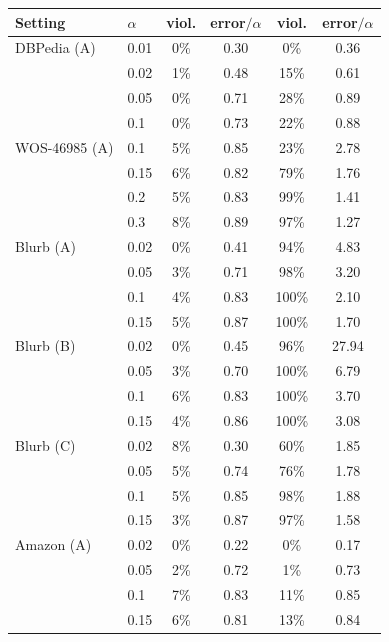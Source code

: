 \begin{tabular}{llcccc}
\toprule
Setting & $\alpha$ & viol. & error$/\alpha$ & viol. & error$/\alpha$ \\
\midrule
DBPedia (A) & 0.01 & 0\% & 0.30 & 0\% & 0.36 \\
 & 0.02 & 1\% & 0.48 & 15\% & 0.61 \\
 & 0.05 & 0\% & 0.71 & 28\% & 0.89 \\
 & 0.1 & 0\% & 0.73 & 22\% & 0.88 \\
\addlinespace
WOS-46985 (A) & 0.1 & 5\% & 0.85 & 23\% & 2.78 \\
 & 0.15 & 6\% & 0.82 & 79\% & 1.76 \\
 & 0.2 & 5\% & 0.83 & 99\% & 1.41 \\
 & 0.3 & 8\% & 0.89 & 97\% & 1.27 \\
\addlinespace
Blurb (A) & 0.02 & 0\% & 0.41 & 94\% & 4.83 \\
 & 0.05 & 3\% & 0.71 & 98\% & 3.20 \\
 & 0.1 & 4\% & 0.83 & 100\% & 2.10 \\
 & 0.15 & 5\% & 0.87 & 100\% & 1.70 \\
\addlinespace
Blurb (B) & 0.02 & 0\% & 0.45 & 96\% & 27.94 \\
 & 0.05 & 3\% & 0.70 & 100\% & 6.79 \\
 & 0.1 & 6\% & 0.83 & 100\% & 3.70 \\
 & 0.15 & 4\% & 0.86 & 100\% & 3.08 \\
\addlinespace
Blurb (C) & 0.02 & 8\% & 0.30 & 60\% & 1.85 \\
 & 0.05 & 5\% & 0.74 & 76\% & 1.78 \\
 & 0.1 & 5\% & 0.85 & 98\% & 1.88 \\
 & 0.15 & 3\% & 0.87 & 97\% & 1.58 \\
\addlinespace
Amazon (A) & 0.02 & 0\% & 0.22 & 0\% & 0.17 \\
 & 0.05 & 2\% & 0.72 & 1\% & 0.73 \\
 & 0.1 & 7\% & 0.83 & 11\% & 0.85 \\
 & 0.15 & 6\% & 0.81 & 13\% & 0.84 \\
\bottomrule
\end{tabular}
